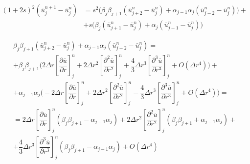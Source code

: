 \begin{equation} \label{taylor_s}
\begin{split}
	\left( 1 + 2s \right)^2 \left( \overline{u}_j^{n+1} - \overline{u}_j^n \right) &= s^2 \biggl( \beta_j \beta_{j+1} \left( \overline{u}_{j+2}^n - \overline{u}_j^n \right) + \alpha_{j-1} \alpha_j \left(  \overline{u}_{j-2}^n - \overline{u}_j^n \right) \biggr) + \\
	& + s \biggl( \beta_j \left( \overline{u}_{j+1}^n - \overline{u}_j^n \right)+  \alpha_j \left( \overline{u}_{j-1}^n - \overline{u}_j^n \right) \biggr) 
\end{split}
\end{equation}

\begin{equation} \label{s^2}
\begin{split}
	&\beta_j \beta_{j+1} \left( \overline{u}_{j+2}^n - \overline{u}_j^n \right) + \alpha_{j-1} \alpha_j \left(  \overline{u}_{j-2}^n - \overline{u}_j^n \right) = \\
	&+ \beta_j \beta_{j+1} \biggl( 2\Delta r \left[ \dfrac{\partial \overline{u}}{\partial r} \right]_j^n + 2 \Delta r^2 \left[ \dfrac{\partial^2 \overline{u}}{\partial r^2}  \right]_j^n + \dfrac{4}{3} \Delta r^3 \left[ \dfrac{\partial^3 \overline{u}}{\partial r^3} \right]_j^n + O(\Delta r^4) \biggr) + \\
	&+ \alpha_{j-1} \alpha_j \biggl( -2\Delta r \left[ \dfrac{\partial \overline{u}}{\partial r} \right]_j^n + 2 \Delta r^2 \left[ \dfrac{\partial^2 \overline{u}}{\partial r^2}  \right]_j^n - \dfrac{4}{3} \Delta r^3 \left[ \dfrac{\partial^3 \overline{u}}{\partial r^3} \right]_j^n + O(\Delta r^4)  \biggr) = \\
	&= 2 \Delta r \left[ \dfrac{\partial \overline{u}}{\partial r} \right]_j^n \left( \beta_j \beta_{j+1} - \alpha_{j-1} \alpha_j \right) + 2 \Delta r^2 \left[ \dfrac{\partial^2 \overline{u}}{\partial r^2} \right]_j^n \left( \beta_j \beta_{j+1} + \alpha_{j-1} \alpha_j \right) + \\
	&+ \dfrac{4}{3} \Delta r^3 \left[ \dfrac{\partial^3 \overline{u}}{\partial r^3} \right]_j^n \left( \beta_j \beta_{j+1} - \alpha_{j-1} \alpha_j \right) + O(\Delta r^4)
\end{split}
\end{equation}


